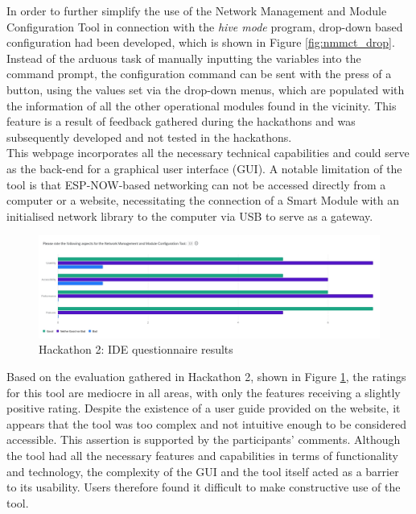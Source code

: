 In order to further simplify the use of the Network Management and Module Configuration Tool in connection with the \textit{hive mode} program, drop-down based configuration had been developed, which is shown in Figure \ref{fig:nmmct_drop}. Instead of the arduous task of manually inputting the variables into the command prompt, the configuration command can be sent with the press of a button, using the values set via the drop-down menus, which are populated with the information of all the other operational modules found in the vicinity. This feature is a result of feedback gathered during the hackathons and was subsequently developed and not tested in the hackathons. \\

This webpage incorporates all the necessary technical capabilities and could serve as the back-end for a graphical user interface (GUI). A notable limitation of the tool is that ESP-NOW-based networking can not be accessed directly from a computer or a website, necessitating the connection of a Smart Module with an initialised network library to the computer via USB to serve as a gateway.

\begin{figure}[H]
    \centering
    \includegraphics[width=\linewidth]{overleaf/images/nmmct_rating.jpg}
    \vspace{\ftspace}
    \caption{Hackathon 2: IDE questionnaire results}
    \vspace{\ftspace}
    \label{fig:nmmct_q}
\end{figure}

Based on the evaluation gathered in Hackathon 2, shown in Figure \ref{fig:nmmct_q}, the ratings for this tool are mediocre in all areas, with only the features receiving a slightly positive rating. Despite the existence of a user guide provided on the website, it appears that the tool was too complex and not intuitive enough to be considered accessible. This assertion is supported by the participants' comments. Although the tool had all the necessary features and capabilities in terms of functionality and technology, the complexity of the GUI and the tool itself acted as a barrier to its usability. Users therefore found it difficult to make constructive use of the tool.

